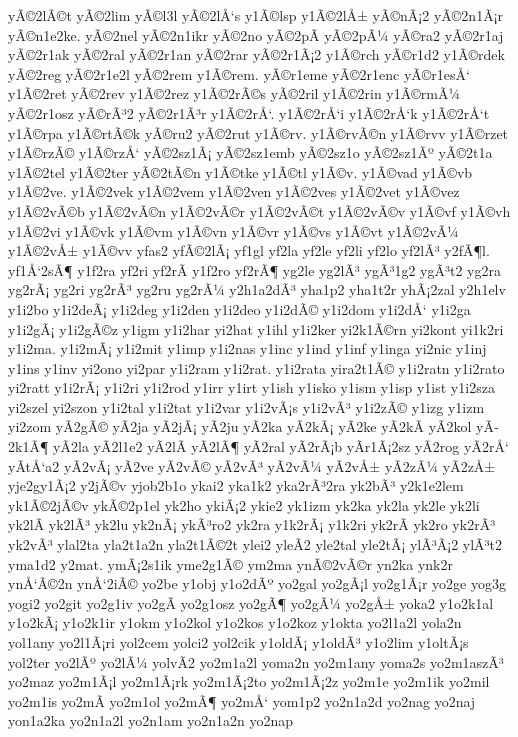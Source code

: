 {yÃ©2lÃ©t
yÃ©2lim
yÃ©l3l
yÃ©2lÅ‘s
y1Ã©lsp
y1Ã©2lÅ±
yÃ©nÃ¡2
yÃ©2n1Ã¡r
yÃ©n1e2ke.
yÃ©2nel
yÃ©2n1ikr
yÃ©2no
yÃ©2pÃ­
yÃ©2pÃ¼
yÃ©ra2
yÃ©2r1aj
yÃ©2r1ak
yÃ©2ral
yÃ©2r1an
yÃ©2rar
yÃ©2r1Ã¡2
y1Ã©rch
yÃ©r1d2
y1Ã©rdek
yÃ©2reg
yÃ©2r1e2l
yÃ©2rem
y1Ã©rem.
yÃ©r1eme
yÃ©2r1enc
yÃ©r1esÅ‘
y1Ã©2ret
yÃ©2rev
y1Ã©2rez
y1Ã©2rÃ©s
yÃ©2ril
y1Ã©2rin
y1Ã©rmÃ¼
yÃ©2r1osz
yÃ©rÃ³2
yÃ©2r1Ã³r
y1Ã©2rÅ‘.
y1Ã©2rÅ‘i
y1Ã©2rÅ‘k
y1Ã©2rÅ‘t
y1Ã©rpa
y1Ã©rtÃ©k
yÃ©ru2
yÃ©2rut
y1Ã©rv.
y1Ã©rvÃ©n
y1Ã©rvv
y1Ã©rzet
y1Ã©rzÃ©
y1Ã©rzÅ‘
yÃ©2sz1Ã¡
yÃ©2sz1emb
yÃ©2sz1o
yÃ©2sz1Ãº
yÃ©2t1a
y1Ã©2tel
y1Ã©2ter
yÃ©2tÃ©n
y1Ã©tke
y1Ã©tl
y1Ã©v.
y1Ã©vad
y1Ã©vb
y1Ã©2ve.
y1Ã©2vek
y1Ã©2vem
y1Ã©2ven
y1Ã©2ves
y1Ã©2vet
y1Ã©vez
y1Ã©2vÃ©b
y1Ã©2vÃ©n
y1Ã©2vÃ©r
y1Ã©2vÃ©t
y1Ã©2vÃ©v
y1Ã©vf
y1Ã©vh
y1Ã©2vi
y1Ã©vk
y1Ã©vm
y1Ã©vn
y1Ã©vr
y1Ã©vs
y1Ã©vt
y1Ã©2vÃ¼
y1Ã©2vÅ±
y1Ã©vv
yfas2
yfÃ©2lÃ¡
yf1gl
yf2la
yf2le
yf2li
yf2lo
yf2lÃ³
y2fÃ¶l.
yf1Å‘2sÃ¶
y1f2ra
yf2ri
yf2rÃ­
y1f2ro
yf2rÃ¶
yg2le
yg2lÃ³
ygÃ³1g2
ygÃ³t2
yg2ra
yg2rÃ¡
yg2ri
yg2rÃ³
yg2ru
yg2rÃ¼
y2h1a2dÃ³
yha1p2
yha1t2r
yhÃ¡2zal
y2h1elv
y1i2bo
y1i2deÃ¡
y1i2deg
y1i2den
y1i2deo
y1i2dÃ©
y1i2dom
y1i2dÅ‘
y1i2ga
y1i2gÃ¡
y1i2gÃ©z
y1igm
y1i2har
yi2hat
y1ihl
y1i2ker
yi2k1Ã©rn
yi2kont
yi1k2ri
y1i2ma.
y1i2mÃ¡
y1i2mit
y1imp
y1i2nas
y1inc
y1ind
y1inf
y1inga
yi2nic
y1inj
y1ins
y1inv
yi2ono
yi2par
y1i2ram
y1i2rat.
y1i2rata
yira2t1Ã©
y1i2ratn
y1i2rato
yi2ratt
y1i2rÃ¡
y1i2ri
y1i2rod
y1irr
y1irt
y1ish
y1isko
y1ism
y1isp
y1ist
y1i2sza
yi2szel
yi2szon
y1i2tal
y1i2tat
y1i2var
y1i2vÃ¡s
y1i2vÃ³
y1i2zÃ©
y1izg
y1izm
yi2zom
yÃ­2gÃ©
yÃ­2ja
yÃ­2jÃ¡
yÃ­2ju
yÃ­2ka
yÃ­2kÃ¡
yÃ­2ke
yÃ­2kÃ­
yÃ­2kol
yÃ­2k1Ã¶
yÃ­2la
yÃ­2l1e2
yÃ­2lÃ­
yÃ­2lÃ¶
yÃ­2ral
yÃ­2rÃ¡b
yÃ­r1Ã¡2sz
yÃ­2rog
yÃ­2rÅ‘
yÃ­tÅ‘a2
yÃ­2vÃ¡
yÃ­2ve
yÃ­2vÃ©
yÃ­2vÃ³
yÃ­2vÃ¼
yÃ­2vÅ±
yÃ­2zÃ¼
yÃ­2zÅ±
yje2gy1Ã¡2
y2jÃ©v
yjob2b1o
ykai2
yka1k2
yka2rÃ³2ra
yk2bÃ³
y2k1e2lem
yk1Ã©2jÃ©v
ykÃ©2p1el
yk2ho
ykiÃ¡2
ykie2
yk1izm
yk2ka
yk2la
yk2le
yk2li
yk2lÃ­
yk2lÃ³
yk2lu
yk2nÃ¡
ykÃ³ro2
yk2ra
y1k2rÃ¡
y1k2ri
yk2rÃ­
yk2ro
yk2rÃ³
yk2vÃ³
ylal2ta
yla2t1a2n
yla2t1Ã©2t
ylei2
yleÃ­2
yle2tal
yle2tÃ¡
ylÃ³Ã¡2
ylÃ³t2
yma1d2
y2mat.
ymÃ¡2s1ik
yme2g1Ã©
ym2ma
ynÃ©2vÃ©r
yn2ka
ynk2r
ynÅ‘Ã©2n
ynÅ‘2iÃ©
yo2be
y1obj
y1o2dÃº
yo2gal
yo2gÃ¡l
yo2g1Ã¡r
yo2ge
yog3g
yogi2
yo2git
yo2g1iv
yo2gÃ­
yo2g1osz
yo2gÃ¶
yo2gÃ¼
yo2gÅ±
yoka2
y1o2k1al
y1o2kÃ¡
y1o2k1ir
y1okm
y1o2kol
y1o2kos
y1o2koz
y1okta
yo2l1a2l
yola2n
yol1any
yo2l1Ã¡ri
yol2cem
yolci2
yol2cik
y1oldÃ¡
y1oldÃ³
y1o2lim
y1oltÃ¡s
yol2ter
yo2lÃº
yo2lÃ¼
yolvÃ­2
yo2m1a2l
yoma2n
yo2m1any
yoma2s
yo2m1aszÃ³
yo2maz
yo2m1Ã¡l
yo2m1Ã¡rk
yo2m1Ã¡2to
yo2m1Ã¡2z
yo2m1e
yo2m1ik
yo2mil
yo2m1is
yo2mÃ­
yo2m1ol
yo2mÃ¶
yo2mÅ‘
yom1p2
yo2n1a2d
yo2nag
yo2naj
yon1a2ka
yo2n1a2l
yo2n1am
yo2n1a2n
yo2nap
}
